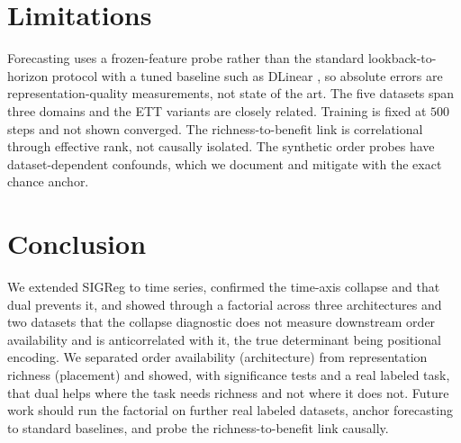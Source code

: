 \documentclass[11pt]{article}
\begin{document}
\section{Limitations}

Forecasting uses a frozen-feature probe rather than the standard lookback-to-horizon protocol with a
tuned baseline such as DLinear \citep{dlinear2023}, so absolute errors are representation-quality
measurements, not state of the art. The five datasets span three domains and the ETT variants are
closely related. Training is fixed at $500$ steps and not shown converged. The richness-to-benefit
link is correlational through effective rank, not causally isolated. The synthetic order probes have
dataset-dependent confounds, which we document and mitigate with the exact chance anchor.

\section{Conclusion}

We extended SIGReg to time series, confirmed the time-axis collapse and that dual prevents it, and
showed through a factorial across three architectures and two datasets that the collapse diagnostic
does not measure downstream order availability and is anticorrelated with it, the true determinant
being positional encoding. We separated order availability (architecture) from representation
richness (placement) and showed, with significance tests and a real labeled task, that dual helps
where the task needs richness and not where it does not. Future work should run the factorial on
further real labeled datasets, anchor forecasting to standard baselines, and probe the
richness-to-benefit link causally.

\small


\end{document}
